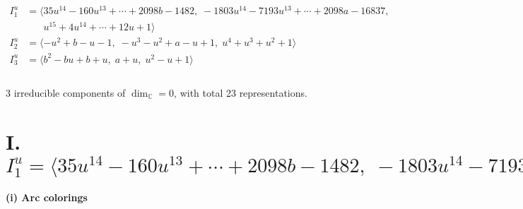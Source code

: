 \documentclass[1p]{elsarticle_modified}
\theoremstyle{definition}
\begin{document}
\begin{align*}
I^u_{1}&=\langle 
35 u^{14}-160 u^{13}+\cdots+2098 b-1482,\;-1803 u^{14}-7193 u^{13}+\cdots+2098 a-16837,\\
\phantom{I^u_{1}}&\phantom{= \langle  }u^{15}+4 u^{14}+\cdots+12 u+1\rangle \\
I^u_{2}&=\langle 
- u^2+b- u-1,\;- u^3- u^2+a- u+1,\;u^4+u^3+u^2+1\rangle \\
I^u_{3}&=\langle 
b^2- b u+b+u,\;a+u,\;u^2- u+1\rangle \\
\\
\end{align*}
\raggedright * 3 irreducible components of $\dim_{\mathbb{C}}=0$, with total 23 representations.\\
\newpage
\renewcommand{\arraystretch}{1}
\centering \section*{I. $I^u_{1}= \langle 35 u^{14}-160 u^{13}+\cdots+2098 b-1482,\;-1803 u^{14}-7193 u^{13}+\cdots+2098 a-16837,\;u^{15}+4 u^{14}+\cdots+12 u+1 \rangle$}
\flushleft \textbf{(i) Arc colorings}\\
\end{document}
